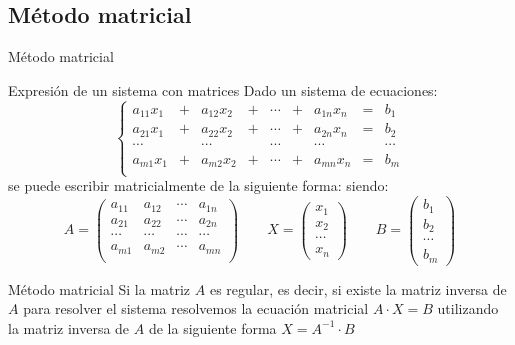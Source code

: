 \documentclass[9pt]{beamer}
\begin{document}
\subsection{Método matricial}
\begin{frame}{Método matricial}
\begin{alertblock}{Expresión de un sistema con matrices}
Dado un sistema de ecuaciones:
\[ \left\lbrace \begin{array}{ccccccccc}
a_{11} x_1 & + & a_{12}x_2 & + & \cdots & + & a_{1n} x_n& = & b_1 \\
a_{21} x_1 & + & a_{22}x_2 &+ & \cdots & + & a_{2n} x_n& = & b_2 \\
\cdots & & \cdots & &  \cdots & & \cdots & & \cdots \\
a_{m1} x_1 & + & a_{m2}x_2 & +& \cdots & + & a_{mn} x_n& = & b_m \\

\end{array} \right. \]
\pause
se puede escribir matricialmente de la siguiente forma:
\pause
siendo:
\[ A= \begin{pmatrix}
a_{11} & a_{12} & \cdots & a_{1n} \\
a_{21} & a_{22} & \cdots & a_{2n} \\
\cdots & \cdots & \cdots & \cdots \\
a_{m1} & a_{m2} & \cdots & a_{mn} \\
\end{pmatrix} \qquad
X= \begin{pmatrix}
x_1 \\ x_ 2 \\ \cdots \\ x_n
\end{pmatrix}
\qquad
B=\begin{pmatrix}
b_1 \\ b_ 2 \\ \cdots \\ b_m
\end{pmatrix} \]
\end{alertblock}
\end{frame}

\begin{frame}{Método matricial}
Si la matriz $A$ es regular, es decir, si existe la matriz inversa de $A$ para resolver el sistema resolvemos la ecuación matricial $A\cdot X = B$ utilizando la matriz inversa de $A$ de la siguiente forma $X=A^{-1}\cdot B$
\end{frame}
\end{document}
